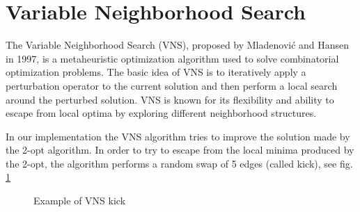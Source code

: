 \section{Variable Neighborhood Search}
The Variable Neighborhood Search (VNS), proposed by Mladenović and Hansen in 1997,  is a metaheuristic optimization algorithm used to solve combinatorial optimization problems. The basic idea of VNS is to iteratively apply a perturbation operator to the current solution and then perform a local search around the perturbed solution. VNS is known for its flexibility and ability to escape from local optima by exploring different neighborhood structures.

In our implementation the VNS algorithm tries to improve the solution made by the 2-opt algorithm. In order to try to escape from the local minima produced by the 2-opt, the algorithm performs a random swap of 5 edges (called kick), see fig. \ref{fig:VNS} %


\begin{figure}[!h]
    \centering
    \caption{Example of VNS kick} \label{fig:VNS}
\end{figure}



